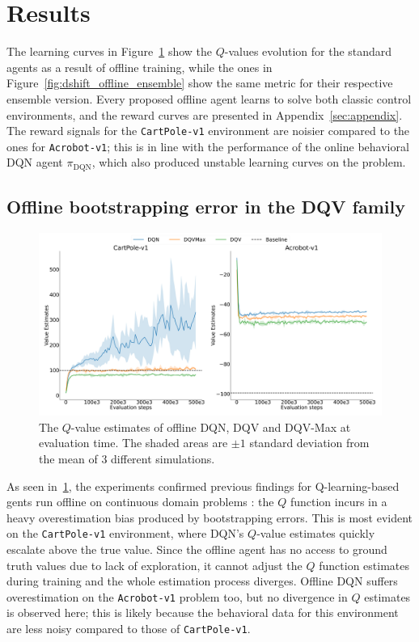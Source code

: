 \section{Results}\label{sec:results}
The learning curves in Figure~\ref{fig:dshift_offline_normal} show the
$Q$-values evolution for the standard agents as a result of offline
training, while the ones in Figure~\ref{fig:dshift_offline_ensemble}
show the same metric for their respective ensemble version. Every
proposed offline agent learns to solve both classic control
environments, and the reward curves are presented in
Appendix~\ref{sec:appendix}.
The reward signals for the \texttt{CartPole-v1} environment are
noisier compared to the ones for \texttt{Acrobot-v1}; this is in line
with the performance of the online behavioral DQN agent
$\pi_{\textrm{DQN}}$, which also produced unstable learning curves on
the problem.

\subsection{Offline bootstrapping error in the DQV family}
\begin{figure}[!tbp]
  \centering
  \includegraphics[width=.5\textwidth]{img/dshift_plots_qv.png}
  \caption{The $Q$-value estimates of offline DQN, DQV and DQV-Max at
    evaluation time. The shaded areas are $\pm 1$ standard deviation
    from the mean of 3 different
    simulations.}\label{fig:dshift_offline_normal}
\end{figure}
As seen in~\ref{fig:dshift_offline_normal}, the experiments confirmed
previous findings for Q-learning-based gents run offline on continuous
domain problems \citep{pmlr-v97-fujimoto19a,kumar2019stabilizing}: the
$Q$ function incurs in a heavy overestimation bias produced by
bootstrapping errors. This is most evident on the \texttt{CartPole-v1}
environment, where DQN's $Q$-value estimates quickly escalate above
the true value. Since the offline agent has no access to ground truth
values due to lack of exploration, it cannot adjust the $Q$ function
estimates during training and the whole estimation process
diverges. Offline DQN suffers overestimation on the
\texttt{Acrobot-v1} problem too, but no divergence in $Q$ estimates is
observed here; this is likely because the behavioral data for this
environment are less noisy compared to those of \texttt{CartPole-v1}.


